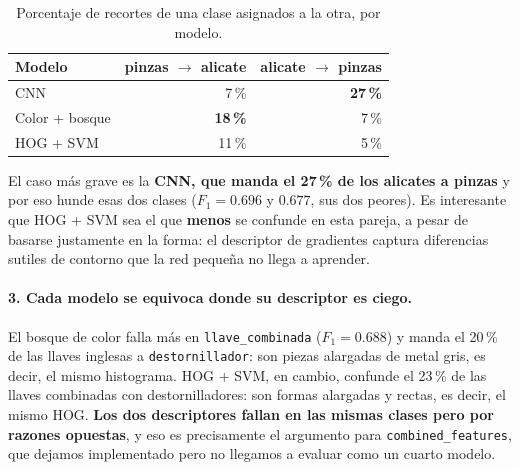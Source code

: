 \documentclass[11pt,a4paper]{article}
\newcommand{\clase}[1]{\texttt{#1}}
\begin{document}
\begin{table}[htbp]
\centering
\caption{Porcentaje de recortes de una clase asignados a la otra, por modelo.}
\label{tab:confusion}
\small
\begin{tabular}{@{}lrr@{}}
\toprule
\textbf{Modelo} & \textbf{pinzas $\to$ alicate} & \textbf{alicate $\to$ pinzas} \\
\midrule
CNN                  &  7\,\% & \textbf{27\,\%} \\
Color + bosque       & \textbf{18\,\%} &  7\,\% \\
HOG + SVM            & 11\,\% &  5\,\% \\
\bottomrule
\end{tabular}
\end{table}

El caso más grave es la \textbf{CNN, que manda el 27\,\% de los alicates a pinzas} y por eso hunde
esas dos clases ($F_1 = 0.696$ y $0.677$, sus dos peores). Es interesante que HOG + SVM sea el que
\textbf{menos} se confunde en esta pareja, a pesar de basarse justamente en la forma: el descriptor
de gradientes captura diferencias sutiles de contorno que la red pequeña no llega a aprender.

\paragraph{3. Cada modelo se equivoca donde su descriptor es ciego.}
El bosque de color falla más en \clase{llave\_combinada} ($F_1 = 0.688$) y manda el 20\,\% de las
llaves inglesas a \clase{destornillador}: son piezas alargadas de metal gris, es decir, el mismo
histograma. HOG + SVM, en cambio, confunde el 23\,\% de las llaves combinadas con destornilladores:
son formas alargadas y rectas, es decir, el mismo HOG. \textbf{Los dos descriptores fallan en las
mismas clases pero por razones opuestas}, y eso es precisamente el argumento para
\texttt{combined\_features}, que dejamos implementado pero no llegamos a evaluar como un cuarto
modelo.
\end{document}
